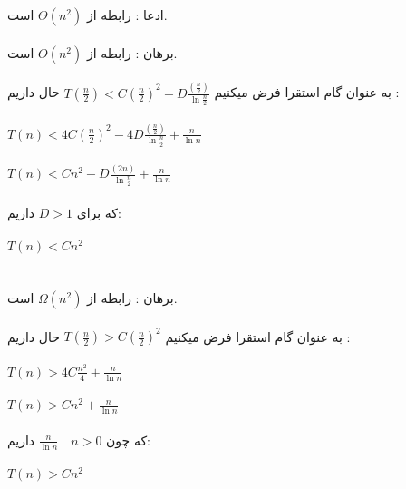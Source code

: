 
\subproblem{}
ادعا : رابطه از $\Theta(n^{2})$ است.\\\\
برهان : رابطه از $O(n^{2})$ است. \\\\
به عنوان گام استقرا فرض میکنیم $T(\frac{n}{2}) < C(\frac{n}{2})^{2} - D\frac{(\frac{n}{2})}{\ln{\frac{n}{2}}}$ حال داریم : \\\\
$T(n) < 4C (\frac{n}{2})^2 - 4D\frac{(\frac{n}{2})}{\ln{\frac{n}{2}}} + \frac{n}{\ln{n}}$\\\\
$T(n) < Cn^2 - D\frac{(2n)}{\ln{\frac{n}{2}}} + \frac{n}{\ln{n}}$\\\\
که برای $D>1$ داریم:\\\\
$T(n) < Cn^{2}$\\\\\\

برهان : رابطه از $\Omega(n^2)$ است. \\\\
به عنوان گام استقرا فرض میکنیم $T(\frac{n}{2}) > C (\frac{n}{2})^{2}$ حال داریم : \\\\
$T(n) > 4C\frac{n^2}{4} + \frac{n}{\ln{n}}$\\\\
$T(n) > Cn^2 + \frac{n}{\ln{n}}$\\\\
که چون $\frac{n}{\ln{n}} \quad n>0$ داریم:\\\\
$T(n) > Cn^2$\\\\